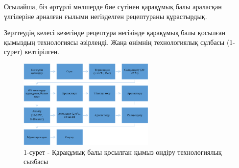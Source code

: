 \begin{multicols}{2}
Осылайша, біз әртүрлі мөлшерде бие сүтінен қарақұмық балы араласқан
үлгілеріне арналған ғылыми негізделген рецептураны құрастырдық.

Зерттеудің келесі кезегінде рецептура негізінде қарақұмық балы қосылған
қымыздың технологиясы әзірленді. Жаңа өнімнің технологиялық сұлбасы
(1-сурет) келтірілген.
\end{multicols}

\begin{figure}[H]
	\centering
	\includegraphics[width=0.6\textwidth]{assets/1105}
	\caption*{1-сурет - Қарақұмық балы қосылған қымыз өндіру технологиялық сызбасы}
\end{figure}

